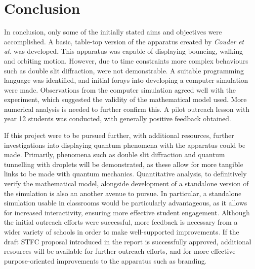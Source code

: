 \section{Conclusion}

In conclusion, only some of the initially stated aims and objectives were accomplished. A basic, table-top version of the apparatus created by \textit{Couder et al.} was developed. This apparatus was capable of displaying bouncing, walking and orbiting motion. However, due to time constraints more complex behaviours such as double slit diffraction, were not demonstrable. A suitable programming language was identified, and initial forays into developing a computer simulation were made. Observations from the computer simulation agreed well with the experiment, which suggested the validity of the mathematical model used. More numerical analysis is needed to further confirm this. A pilot outreach lesson with year 12 students was conducted, with generally positive feedback obtained.

If this project were to be pursued further, with additional resources, further investigations into displaying quantum phenomena with the apparatus could be made. Primarily, phenomena such as double slit diffraction and quantum tunnelling with droplets will be demonstrated, as these allow for more tangible links to be made with quantum mechanics. Quantitative analysis, to definitively verify the mathematical model, alongside development of a standalone version of the simulation is also an another avenue to pursue. In particular, a standalone simulation usable in classrooms would be particularly advantageous, as it allows for increased interactivity, ensuring more effective student engagement. Although the initial outreach efforts were successful, more feedback is necessary from a wider variety of schools in order to make well-supported improvements. If the draft STFC proposal introduced in the report is successfully approved, additional resources will be available for further outreach efforts, and for more effective purpose-oriented improvements to the apparatus such as branding. 